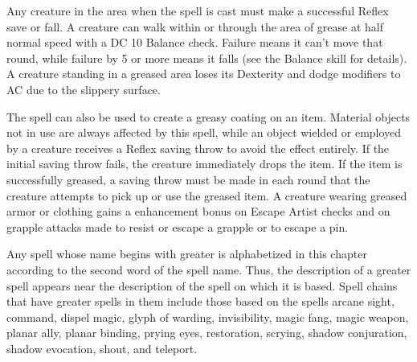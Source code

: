 \spellrng{\rngclose}
\begin{spelleffect}
  Any creature in the area when the spell is cast must make a successful Reflex save or fall. A creature can walk within or through the area of grease at half normal speed with a DC 10 Balance check. Failure means it can't move that round, while failure by 5 or more means it falls (see the Balance skill for details). A creature standing in a greased area loses its Dexterity and dodge modifiers to AC due to the slippery surface.
  \par The spell can also be used to create a greasy coating on an item. Material objects not in use are always affected by this spell, while an object wielded or employed by a creature receives a Reflex saving throw to avoid the effect entirely. If the initial saving throw fails, the creature immediately drops the item. If the item is successfully greased, a saving throw must be made in each round that the creature attempts to pick up or use the greased item. A creature wearing greased armor or clothing gains a  enhancement bonus on Escape Artist checks and on grapple attacks made to resist or escape a grapple or to escape a pin.
\end{spelleffect}

\par Any spell whose name begins with greater is alphabetized in this chapter according to the second word of the spell name. Thus, the description of a greater spell appears near the description of the spell on which it is based. Spell chains that have greater spells in them include those based on the spells arcane sight, command, dispel magic, glyph of warding, invisibility, magic fang, magic weapon, planar ally, planar binding, prying eyes, restoration, scrying, shadow conjuration, shadow evocation, shout, and teleport.

